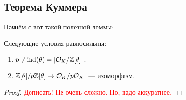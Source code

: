 	\subsection{Теорема Куммера}

	Начнём с вот такой полезной леммы:

	\begin{lemma}\label{ind_and_p}
		Следующие условия равносильны:
		\begin{enumerate}
			\item $p \not\ \mid \operatorname{ind}(\theta) = |\mathcal{O}_{K}/\mathbb{Z}[\theta]|$.
			\item $\mathbb{Z}[\theta]/p\mathbb{Z}[\theta] \to \mathcal{O}_{K}/p\mathcal{O}_{K}$~--- изоморфизм.
		\end{enumerate}
	\end{lemma}

	\begin{proof}
		\textcolor{red}{Дописать! Не очень сложно. Но, надо аккуратнее. }
	\end{proof}

